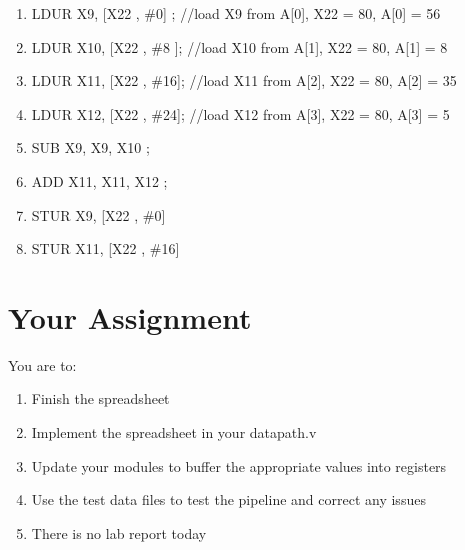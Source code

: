 \begin{enumerate}
\item LDUR X9, [X22 , \#0] ;     //load X9 from A[0], X22 = 80, A[0] = 56
\item LDUR X10, [X22 , \#8 ];    //load X10 from A[1], X22 = 80, A[1] = 8
\item LDUR X11, [X22 , \#16];    //load X11 from A[2], X22 = 80, A[2] = 35 
\item LDUR X12, [X22 , \#24];    //load X12 from A[3], X22 = 80, A[3] = 5
\item SUB X9, X9, X10 ; 
\item ADD X11, X11, X12 ; 
\item STUR X9,  [X22 , \#0]
\item STUR X11, [X22 , \#16]
\end{enumerate}
  


\section{Your Assignment}

You are to:
\begin{enumerate}
\item Finish the spreadsheet
\item Implement the spreadsheet in your datapath.v
\item Update your modules to buffer the appropriate values into registers
\item Use the test data files to test the pipeline and correct any issues
\item There is no lab report today
\end{enumerate} 